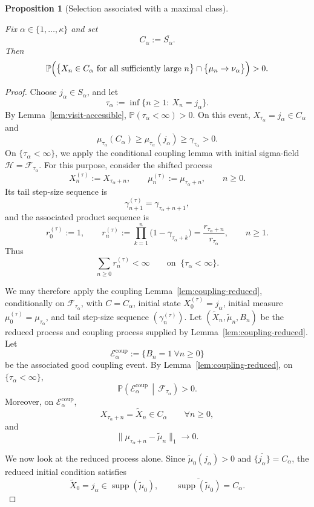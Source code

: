 \documentclass[10pt,letterpaper]{article}
\theoremstyle{compactplain}
\newtheorem{proposition}[theorem]{Proposition}
\theoremstyle{compactdefinition}
\DeclareMathOperator{\supp}{supp}
\newcommand{\1}{\mathds{1}}
\begin{document}
\begin{proposition}[Selection associated with a maximal class]
\label{prop:strong-one-alpha}

Fix \(\alpha\in\{1,\ldots,\kappa\}\) and set
\[
C_\alpha:=\overline{S_\alpha}.
\]
Then
\[
\mathbb P\Bigl(\bigl\{X_n\in C_\alpha \text{ for all sufficiently large }n\bigr\}
\cap
\bigl\{\mu_n\to\nu_\alpha\bigr\}\Bigr)>0.
\]
\end{proposition}

\begin{proof}
Choose \(j_\alpha\in S_\alpha\), and let
\[
\tau_\alpha:=\inf\{n\geq 1:\ X_n=j_\alpha\}.
\]
By Lemma~\ref{lem:visit-accessible},
\(\mathbb P(\tau_\alpha<\infty)>0\). On this event,
\(X_{\tau_\alpha}=j_\alpha\in C_\alpha\) and
\[
\mu_{\tau_\alpha}(C_\alpha)
\geq
\mu_{\tau_\alpha}(j_\alpha)
\geq
\gamma_{\tau_\alpha}
>0.
\]
On \(\{\tau_\alpha<\infty\}\), we apply the conditional coupling lemma with
initial sigma-field \(\mathcal H=\mathcal F_{\tau_\alpha}\). For this purpose,
consider the shifted process
\[
X_n^{(\tau)}:=X_{\tau_\alpha+n},
\qquad
\mu_n^{(\tau)}:=\mu_{\tau_\alpha+n},
\qquad n\geq0.
\]
Its tail step-size sequence is
\[
\gamma_{n+1}^{(\tau)}
=
\gamma_{\tau_\alpha+n+1},
\]
and the associated product sequence is
\[
r_0^{(\tau)}:=1,
\qquad
r_n^{(\tau)}
:=
\prod_{k=1}^n
\bigl(1-\gamma_{\tau_\alpha+k}\bigr)
=
\frac{r_{\tau_\alpha+n}}{r_{\tau_\alpha}},
\qquad n\geq1.
\]
Thus
\[
\sum_{n\geq0}r_n^{(\tau)}<\infty
\qquad\text{on } \ \{\tau_\alpha<\infty\}.
\]


We may therefore apply the coupling Lemma~\ref{lem:coupling-reduced}, conditionally on
\(\mathcal F_{\tau_\alpha}\), with \(C=C_\alpha\), initial state
\(X_0^{(\tau)}=j_\alpha\), initial measure
\(\mu_0^{(\tau)}=\mu_{\tau_\alpha}\), and tail step-size sequence
\((\gamma_n^{(\tau)})\). Let
\((\widetilde X_n,\widetilde\mu_n,B_n)\)
be the reduced process and coupling process supplied by
Lemma~\ref{lem:coupling-reduced}. Let
\[
\mathcal E_\alpha^{\mathrm{coup}}
:=
\{B_n=1\ \forall n\geq0\}
\]
be the associated good coupling event.
By Lemma~\ref{lem:coupling-reduced}, on \(\{\tau_\alpha<\infty\}\),
\[
\mathbb P\left(
\mathcal E_\alpha^{\mathrm{coup}}
\,\middle|\,
\mathcal F_{\tau_\alpha}
\right)>0.
\]
Moreover, on \(\mathcal E_\alpha^{\mathrm{coup}}\),
\[
X_{\tau_\alpha+n}=\widetilde X_n\in C_\alpha
\qquad \forall n\geq0,
\]
and
\[
\|\mu_{\tau_\alpha+n}-\widetilde\mu_n\|_1\longrightarrow0.
\]

We now look at the reduced process alone. 
Since \(\widetilde\mu_0(j_\alpha)>0\) and
\(\overline{\{j_\alpha\}}=C_\alpha\), the reduced initial condition satisfies
\[
\widetilde X_0=j_\alpha\in\supp(\widetilde\mu_0),
\qquad
\overline{\supp(\widetilde\mu_0)}=C_\alpha.
\]


\end{proof}
\end{document}

